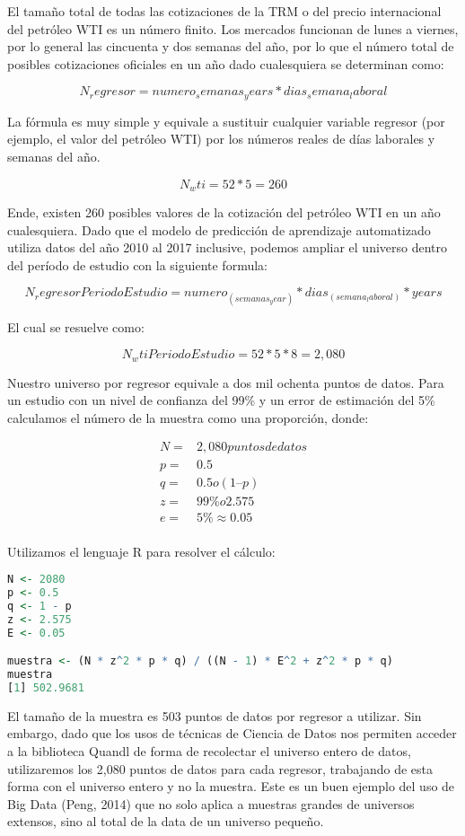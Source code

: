 El tamaño total de todas las cotizaciones de la TRM o del precio internacional del petróleo WTI es un número finito. Los mercados funcionan de lunes a viernes, por lo general las cincuenta y dos semanas del año, por lo que el número total de posibles cotizaciones oficiales en un año dado cualesquiera se determinan como:

\[N_regresor=numero_semanas_years*dias_semana_laboral\]

La fórmula es muy simple y equivale a sustituir cualquier variable regresor (por ejemplo, el valor del petróleo WTI) por los números reales de días laborales y semanas del año. 

\[N_wti=52*5=260\]

Ende, existen 260 posibles valores de la cotización del petróleo WTI en un año cualesquiera. Dado que el modelo de predicción de aprendizaje automatizado utiliza datos del año 2010 al 2017 inclusive, podemos ampliar el universo dentro del período de estudio con la siguiente formula:

\[N_regresorPeriodoEstudio=numero_(semanas_year )*dias_(semana_laboral )*years\]

El cual se resuelve como:

\[N_wtiPeriodoEstudio=52*5*8=2,080\]

Nuestro universo por regresor equivale a dos mil ochenta puntos de datos. Para un estudio con un nivel de confianza del 99\% y un error de estimación del 5\% calculamos el número de la muestra como una proporción, donde:

\begin{align*}
  N =& 2,080 {puntos de datos} \\
  p =& 0.5 \\
  q =& 0.5 {o} (1 – p) \\
  z =& 99\% {o 2.575} \\
  e =& 5\% {\approx 0.05} \\
\end{align*}

Utilizamos el lenguaje R para resolver el cálculo:

\begin{lstlisting}[language=R]
N <- 2080
p <- 0.5
q <- 1 - p
z <- 2.575
E <- 0.05

muestra <- (N * z^2 * p * q) / ((N - 1) * E^2 + z^2 * p * q)
muestra
[1] 502.9681
\end{lstlisting}

El tamaño de la muestra es 503 puntos de datos por regresor a utilizar. Sin embargo, dado que los usos de técnicas de Ciencia de Datos nos permiten acceder a la biblioteca Quandl de forma de recolectar el universo entero de datos, utilizaremos los 2,080 puntos de datos para cada regresor, trabajando de esta forma con el universo entero y no la muestra. Este es un buen ejemplo del uso de Big Data (Peng, 2014) que no solo aplica a muestras grandes de universos extensos, sino al total de la data de un universo pequeño. 

